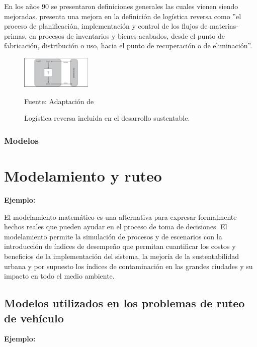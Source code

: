 En los años 90 se presentaron definiciones generales las cuales vienen siendo mejoradas. \cite{Dekker} presenta una mejora en la definición de logística reversa como  ”el proceso de planificación, implementación y control de los flujos de materias-primas, en procesos de inventarios y bienes acabados, desde el punto de fabricación, distribución o uso, hacia el punto de recuperación o de eliminación”. 
\begin{figure}[ht]
\begin{center}
\includegraphics[width=0.3\textwidth]{Figura1}
\end{center}
\begin{center}
\vskip -0.5cm
\caption{\small{Logística reversa incluida en el desarrollo sustentable.}}
{\small{Fuente: Adaptación de \cite{Tanguay}}}
\end{center}
\end{figure}


\subsubsection{Modelos}

\section{Modelamiento y ruteo }

{\bf Ejemplo:}\par

El modelamiento matemático es una alternativa para expresar formalmente hechos reales que pueden ayudar en el proceso de toma de decisiones. El modelamiento permite la simulación de procesos  y de escenarios con la introducción de índices de desempeño que permitan cuantificar los costos y beneficios de la implementación del sistema, la mejoría de la sustentabilidad urbana y por supuesto los índices de contaminación en las grandes ciudades y su impacto en todo el medio ambiente. 

\subsection{Modelos utilizados en los problemas de ruteo de vehículo }

{\bf Ejemplo:}\par

